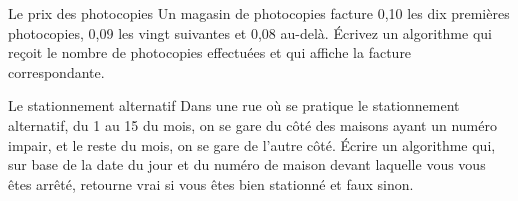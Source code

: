	\begin{Exercice}{Le prix des photocopies}
		Un magasin de photocopies facture 0,10 \texteuro{} 
		les dix premières photocopies, 
		0,09 \texteuro{} les vingt suivantes 
		et 0,08 \texteuro{} au-delà. 
		Écrivez un algorithme 
		qui reçoit le nombre de photocopies effectuées 
		et qui affiche la facture correspondante.
	\end{Exercice}

	\begin{Exercice}{Le stationnement alternatif}
		Dans une rue où se pratique le stationnement alternatif, 
		du 1 au 15 du mois, on se gare du côté des maisons ayant un numéro impair, 
		et le reste du mois, on se gare de l’autre côté. 
		Écrire un algorithme qui, sur base de la date du jour et du numéro de maison
		devant laquelle vous vous êtes arrêté, 
		retourne vrai si vous êtes bien stationné et faux sinon.
	\end{Exercice}

	
